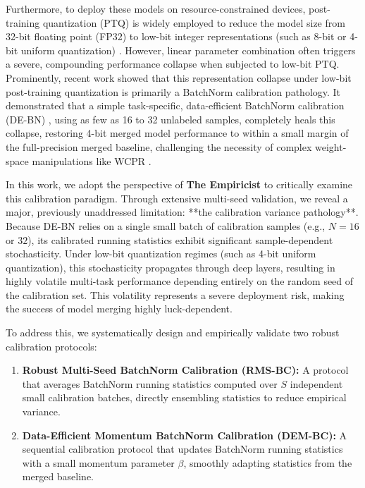 \documentclass{article}
\begin{document}
Furthermore, to deploy these models on resource-constrained devices, post-training quantization (PTQ) is widely employed to reduce the model size from 32-bit floating point (FP32) to low-bit integer representations (such as 8-bit or 4-bit uniform quantization) \cite{gholami21, dettmers22, frantar23, shao23}. However, linear parameter combination often triggers a severe, compounding performance collapse when subjected to low-bit PTQ. Prominently, recent work \cite{qu25} showed that this representation collapse under low-bit post-training quantization is primarily a BatchNorm calibration pathology. It demonstrated that a simple task-specific, data-efficient BatchNorm calibration (DE-BN) \cite{shomron20}, using as few as 16 to 32 unlabeled samples, completely heals this collapse, restoring 4-bit merged model performance to within a small margin of the full-precision merged baseline, challenging the necessity of complex weight-space manipulations like WCPR \cite{frantar23obc}.

In this work, we adopt the perspective of \textbf{The Empiricist} to critically examine this calibration paradigm. Through extensive multi-seed validation, we reveal a major, previously unaddressed limitation: **the calibration variance pathology**. Because DE-BN relies on a single small batch of calibration samples (e.g., $N=16$ or $32$), its calibrated running statistics exhibit significant sample-dependent stochasticity. Under low-bit quantization regimes (such as 4-bit uniform quantization), this stochasticity propagates through deep layers, resulting in highly volatile multi-task performance depending entirely on the random seed of the calibration set. This volatility represents a severe deployment risk, making the success of model merging highly luck-dependent.

To address this, we systematically design and empirically validate two robust calibration protocols:
\begin{enumerate}
    \item \textbf{Robust Multi-Seed BatchNorm Calibration (RMS-BC):} A protocol that averages BatchNorm running statistics computed over $S$ independent small calibration batches, directly ensembling statistics to reduce empirical variance.
    \item \textbf{Data-Efficient Momentum BatchNorm Calibration (DEM-BC):} A sequential calibration protocol that updates BatchNorm running statistics with a small momentum parameter $\beta$, smoothly adapting statistics from the merged baseline.
\end{enumerate}
\end{document}
